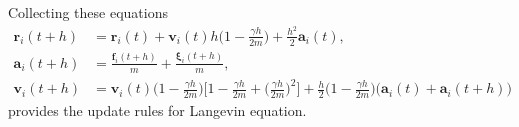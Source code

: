 \documentclass[../talant.diss.submit.tex]{subfiles}
\begin{document}
%
Collecting these equations
\begin{align}
  \label{eq:finale_update}
  \bm{r}_{i}(t+h) & = \bm{r}_{i}(t) + \bm{v}_{i}(t)h
  \Big(1 - \frac{\gamma h}{2m} \Big) + \frac{h^2}{2} \bm{a}_{i}(t),         \nonumber \\
  \bm{a}_{i}(t+h) & = \frac{\bm{f}_{i}(t+h)}{m} + \frac{\bm{\xi}_{i}(t+h)}{m},  \\
  \bm{v}_{i}(t+h) & = \bm{v}_{i}(t)\Big(1 - \frac{\gamma h}{2m}\Big) 
  \Big[1 - \frac{\gamma h}{2m} + \Big( \frac{\gamma h}{2m} \Big)^2 \Big] + \nonumber  
                  \frac{h}{2} \Big(1 - \frac{\gamma h}{2m} \Big) \Big (\bm{a}_{i}(t) + \bm{a}_{i}(t+h)\Big)\nonumber   
\end{align}
%
provides the update rules for Langevin equation.
\end{document}

